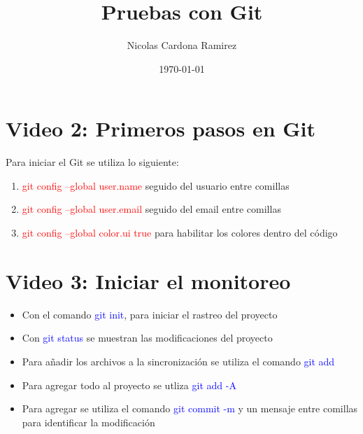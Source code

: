 \documentclass{article}
\title{Pruebas con Git}
\author{Nicolas Cardona Ramirez}
\date{\today}
\begin{document}
	
	\maketitle
	
	\section{Video 2: Primeros pasos en Git}
	
	
	Para iniciar el Git se utiliza lo siguiente:
	\begin{enumerate}
		\item \textcolor{red}{git config --global user.name} seguido del usuario entre comillas
		\item \textcolor{red}{git config --global user.email} seguido del email entre comillas
		\item \textcolor{red}{git config --global color.ui true} para habilitar los colores dentro del código
	\end{enumerate}
	
	\section{Video 3: Iniciar el monitoreo}
	
	\begin{itemize}
		\item Con el comando \textcolor{blue}{git init}, para iniciar el rastreo del proyecto
		\item Con \textcolor{blue}{git status} se muestran las modificaciones del proyecto
		\item Para añadir los archivos a la sincronización se utiliza el comando \textcolor{blue}{git add}
		\item Para agregar todo al proyecto se utliza \textcolor{blue}{git add -A}
		\item Para agregar se utiliza el comando \textcolor{blue}{git commit -m} y un mensaje entre comillas para identificar la modificación
	\end{itemize}

	
	
\end{document}
